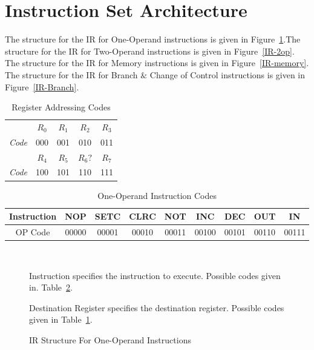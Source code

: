 \documentclass[12pt]{article}
\theoremstyle{plain}
\theoremstyle{definition}
\begin{document}
\section{Instruction Set Architecture}
    The structure for the IR for One-Operand instructions is given in Figure~\ref{IR-1op}.The structure for the IR for Two-Operand instructions is given in Figure~\ref{IR-2op}. The structure for the IR for Memory instructions is given in Figure~\ref{IR-memory}. The structure for the IR for Branch $\&$ Change of Control instructions is given in Figure~\ref{IR-Branch}.
    \begin{table}[H]
        \centering
        \begin{tabular}{c|c|c|c|c|}
            \cline{2-5}
                            & $R_0$ & $R_1$ & $R_2$ & $R_3$ \\ \cline{2-5} 
            \textit{Code}   & 000      & 001            & 010            & 011     \\ \cline{2-5} 
                            & $R_4$ & $R_5$ & $R_6?$ & $R_7$ \\ \cline{2-5} 
            \textit{Code}   & 100      & 101            & 110            & 111     \\ \cline{2-5} 
        \end{tabular}
        \caption{Register Addressing Codes}
        \label{reg-addr-codes}
    \end{table}
    \begin{table}[H]
        \centering
        \begin{tabular}{|c|c|c|c|c|c|c|c|c|}
            \hline
            Instruction  & NOP & SETC & CLRC  & NOT & INC & DEC & OUT & IN  \\ \hline
            OP Code     & 00000 & 00001 & 00010 & 00011 & 00100 & 00101 & 00110 & 00111 \\ \hline
        \end{tabular}
        \caption{One-Operand Instruction Codes}
        \label{One_Op Opcodes}
    \end{table}
    
    \begin{figure}[H]
        \centering
        \caption{IR Structure For One-Operand Instructions}
        \label{IR-1op}
        \vspace{0.5 cm}
        \\
        \vspace{0.5 cm}
        \begin{regdesc}\begin{reglist}
            \item [Instruction] specifies the instruction to execute. Possible codes given in. Table~\ref{One_Op Opcodes}.
            \item [Destination Register] specifies the destination register. Possible codes given in Table~\ref{reg-addr-codes}.
        \end{reglist}\end{regdesc}
    \end{figure}
    
\end{document}

